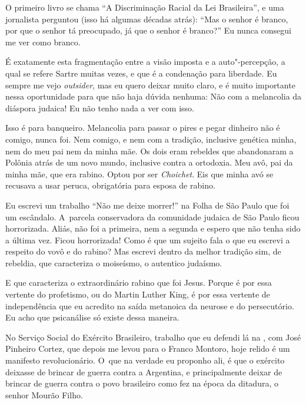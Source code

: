 O primeiro livro se chama ``A Discriminação Racial da Lei Brasileira'',
e uma jornalista perguntou (isso há algumas décadas atrás): ``Mas o
senhor é branco, por que o senhor tá preocupado, já que o senhor é
branco?'' Eu nunca consegui me ver como branco.

 

É exatamente esta fragmentação entre a visão imposta e a auto"-percepção,
a qual se refere Sartre muitas vezes, e que é a condenação para
liberdade. Eu sempre me vejo \emph{outsider}, mas eu quero deixar muito
claro, e é muito importante nessa oportunidade para que não haja dúvida
nenhuma: Não com a melancolia da diáspora judaica! Eu não tenho nada a
ver com isso.

 

Isso é para banqueiro. Melancolia para passar o pires e pegar dinheiro
não é comigo, nunca foi. Nem comigo, e nem com a tradição, inclusive
genética minha, nem do meu pai nem da minha mãe. Os dois eram rebeldes
que abandonaram a Polônia atrás de um novo mundo, inclusive contra a
ortodoxia. Meu avô, pai da minha mãe, que era rabino. Optou por ser
\emph{Choichet}. Eis que minha avó se recusava a usar peruca,
obrigatória para esposa de rabino.

 

Eu escrevi um trabalho ``Não me deixe morrer!'' na Folha de São Paulo
que foi um escândalo. A~parcela conservadora da comunidade judaica de
São Paulo ficou horrorizada. Aliás, não foi a primeira, nem a segunda e
espero que não tenha sido a última vez. Ficou horrorizada! Como é que um
sujeito fala o que eu escrevi a respeito do vovô e do rabino? Mas
escrevi dentro da melhor tradição sim, de rebeldia, que caracteriza o
moiseísmo, o autentico judaísmo.

 

E que caracteriza o extraordinário rabino que foi Jesus. Porque é por
essa vertente do profetismo, ou do Martin Luther King, é por essa
vertente de independência que eu acredito na saída metanoica da neurose
e do persecutório. Eu acho que psicanálise só existe dessa maneira.

 

No Serviço Social do Exército Brasileiro, trabalho que eu defendi lá na
, com José Pinheiro Cortez, que depois me levou para o Franco
Montoro, hoje relido é um manifesto revolucionário. O~que na verdade eu
proponho ali, é que o exército deixasse de brincar de guerra contra a
Argentina, e principalmente deixar de brincar de guerra contra o povo
brasileiro como fez na época da ditadura, o senhor Mourão Filho.

